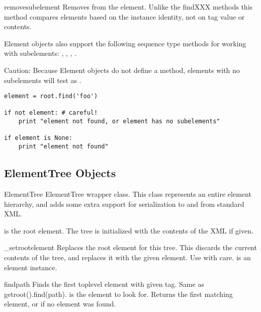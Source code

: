 \begin{methoddesc}[Element]{remove}{subelement}
Removes  from the element.  
Unlike the findXXX methods this method compares elements based on 
the instance identity, not on tag value or contents.
\end{methoddesc}

Element objects also support the following sequence type methods for
working with subelements: ,
, , .

Caution: Because Element objects do not define a
 method, elements with no subelements will test
as .

\begin{verbatim}
element = root.find('foo')

if not element: # careful!
    print "element not found, or element has no subelements"

if element is None:
    print "element not found"
\end{verbatim}


\subsection{ElementTree Objects\label{elementtree-elementtree-objects}}

\begin{classdesc}{ElementTree}{ }
ElementTree wrapper class.  This class represents an entire element
hierarchy, and adds some extra support for serialization to and from
standard XML.

 is the root element.
The tree is initialized with the contents of the XML  if given.
\end{classdesc}

\begin{methoddesc}{_setroot}{element}
Replaces the root element for this tree.  This discards the
current contents of the tree, and replaces it with the given
element.  Use with care.
 is an element instance.
\end{methoddesc}

\begin{methoddesc}{find}{path}
Finds the first toplevel element with given tag.
Same as getroot().find(path).
 is the element to look for.
Returns the first matching element, or  if no element was found.
\end{methoddesc}

